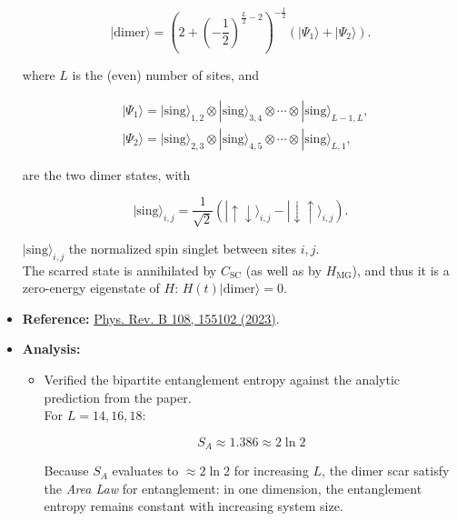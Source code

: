 \documentclass[11pt]{article}
\begin{document}
\begin{itemize}
    \begin{equation}
    | \text{dimer} \rangle = \left( 2 + \left( -\frac{1}{2} \right)^{\frac{L}{2} - 2} \right)^{-\frac{1}{2}} \left( |\Psi_1\rangle + |\Psi_2\rangle \right).
    \end{equation}

    where $L$ is the (even) number of sites, and
    
    \begin{align}
    &|\Psi_1\rangle = | \text{sing} \rangle_{1,2} \otimes | \text{sing} \rangle_{3,4} \otimes \cdots \otimes | \text{sing} \rangle_{L-1,L}, \\
    &|\Psi_2\rangle = | \text{sing} \rangle_{2,3} \otimes | \text{sing} \rangle_{4,5} \otimes \cdots \otimes | \text{sing} \rangle_{L,1},
    \end{align}
    
    are the two dimer states, with
    
    \begin{equation}
    | \text{sing} \rangle_{i,j} = \frac{1}{\sqrt{2}} \left( | \uparrow \downarrow \rangle_{i,j} - | \downarrow \uparrow \rangle_{i,j} \right).
    \end{equation}
    
    $| \text{sing} \rangle_{i,j}$ the normalized spin singlet between sites $i,j$.\\
    The scarred state is annihilated by $C_{\text{SC}}$ (as well as by $H_{\text{MG}}$), and thus it is a zero-energy eigenstate of $H$: $H(t)| \text{dimer} \rangle = 0$.
       
    \item \textbf{Reference:} \href{https://journals.aps.org/prb/abstract/10.1103/PhysRevB.108.155102}{Phys. Rev. B 108, 155102 (2023)}.
    \item \textbf{Analysis:}
    \begin{itemize}
        \item Verified the bipartite entanglement entropy against the analytic prediction from the paper.\\ For $L=14,16,18$:
        
        \begin{equation}
        S_A \approx 1.386 \approx 2 \ln 2
        \end{equation}
        
        Because $S_A$ evaluates to $\approx 2 \ln 2$ for increasing $L$, the dimer scar satisfy the \textit{Area Law} for entanglement: in one dimension, the entanglement entropy remains constant with increasing system size.
        

\end{itemize}
\end{itemize}
\end{document}
